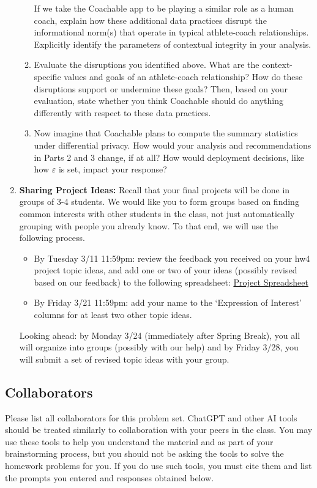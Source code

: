 \documentclass[11pt]{article}
\begin{document}
\begin{enumerate}[leftmargin=*]
\begin{enumerate}
    If we take the Coachable app to be playing a similar role as a human coach, explain how these additional data practices disrupt the informational norm(s) that operate in typical athlete-coach relationships. Explicitly identify the parameters of contextual integrity in your analysis.

    \item Evaluate the disruptions you identified above. What are the context-specific values and goals of an athlete-coach relationship? How do these disruptions support or undermine these goals? Then, based on your evaluation, state whether you think Coachable should do anything differently with respect to these data practices. 

    \item Now imagine that Coachable plans to compute the summary statistics under differential privacy. How would your analysis and recommendations in Parts 2 and 3 change, if at all? How would deployment decisions, like how $\varepsilon$ is set, impact your response?

    \end{enumerate}

\item \textbf{Sharing Project Ideas:}
Recall that your final projects will be done in groups of 3-4 students. We would like you to form groups based on finding common interests with other students in the class, not just automatically grouping with people you already know. To that end, we will use the following process.
\begin{itemize}
    \item By Tuesday 3/11 11:59pm: review the feedback you received on your hw4 project topic ideas, and add one or two of your ideas (possibly revised based on our feedback) to the following spreadsheet: \href{https://docs.google.com/spreadsheets/d/1gxPtxZU835YJ_yZbDQtneGnusvXHWax4sDi-fodu2wA/edit?gid=0#gid=0}{Project Spreadsheet} 
    \item By Friday 3/21 11:59pm: add your name to the `Expression of Interest' columns for at least two other topic ideas.
\end{itemize}
Looking ahead: by Monday 3/24 (immediately after Spring Break), you all will organize into groups (possibly with our help) and by Friday 3/28, you will submit a set of revised topic ideas with your group.
\end{enumerate}

\subsection*{Collaborators}
Please list all collaborators for this problem set. ChatGPT and other AI tools should be treated similarly to collaboration with your peers in the 
class.  You may use these tools to help you understand the material and as part of your 
brainstorming process, but you should not be asking the tools to solve the homework problems 
for you. If you do use such tools, you must cite them and  list the 
prompts you entered and responses obtained below.
\end{document}
